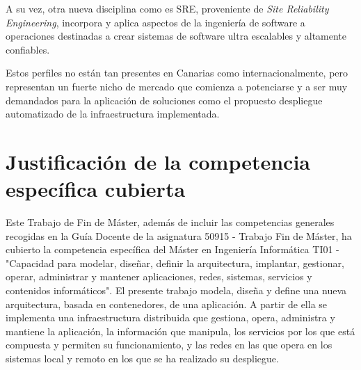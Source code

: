A su vez, otra nueva disciplina como es SRE, proveniente de \textit{Site Reliability Engineering}, incorpora y aplica aspectos de la ingeniería de software a operaciones destinadas a crear sistemas de software ultra escalables y altamente confiables. 

Estos perfiles no están tan presentes en Canarias como internacionalmente, pero representan un fuerte nicho de mercado que comienza a potenciarse y a ser muy demandados para la aplicación de soluciones como el propuesto despliegue automatizado de la infraestructura implementada.

\section{Justificación de la competencia específica cubierta}

Este Trabajo de Fin de Máster, además de incluir las competencias generales recogidas en la Guía Docente de la asignatura 50915 - Trabajo Fin de Máster, ha cubierto la competencia específica del Máster en Ingeniería Informática TI01 - "Capacidad para modelar, diseñar, definir la arquitectura, implantar, gestionar, operar, administrar y mantener aplicaciones, redes, sistemas, servicios y contenidos informáticos". El presente trabajo modela, diseña y define una nueva arquitectura, basada en contenedores, de una aplicación. A partir de ella se implementa una infraestructura distribuida que gestiona, opera, administra y mantiene la aplicación, la información que manipula, los servicios por los que está compuesta y permiten su funcionamiento, y las redes en las que opera en los sistemas local y remoto en los que se ha realizado su despliegue.


